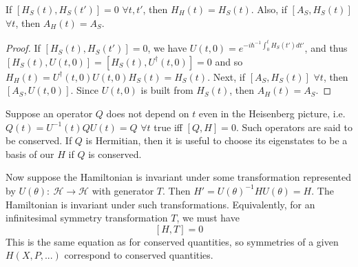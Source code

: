 \documentclass[a4paper]{article}
\begin{document}
\begin{thm}
If $[H_S(t),H_S(t')]=0$ $\forall t,t'$, then $H_H(t)=H_S(t)$. Also, if $[A_S,H_S(t)]$ $\forall t$, then $A_H(t)=A_S$.
\end{thm}
\begin{proof}
If $[H_S(t),H_S(t')]=0$, we have $U(t,0)=e^{-i\hbar^{-1}\int_0^tH_S(t')dt'}$, and thus $[H_S(t),U(t,0)]=[H_S(t),U^\dag(t,0)]=0$ and so $H_H(t)=U^\dag(t,0)U(t,0)H_S(t)=H_S(t)$. Next, if $[A_S,H_S(t)]$ $\forall t$, then $[A_S,U(t,0)]$. Since $U(t,0)$ is built from $H_S(t)$, then $A_H(t)=A_S$.
\end{proof}
\begin{defi}
Suppose an operator $Q$ does not depend on $t$ even in the Heisenberg picture, i.e. $Q(t)=U^{-1}(t)QU(t)=Q$ $\forall t$ true iff $[Q,H]=0$. Such operators are said to be conserved. If $Q$ is Hermitian, then it is useful to choose its eigenstates to be a basis of our $H$ if $Q$ is conserved.
\end{defi}
\begin{defi}
Now suppose the Hamiltonian is invariant under some transformation represented by $U(\theta):~\mathcal{H}\rightarrow\mathcal{H}$ with generator $T$. Then $H'=U(\theta)^{-1}HU(\theta)=H$. The Hamiltonian is invariant under such transformations. Equivalently, for an infinitesimal symmetry transformation $T$, we must have
$$[H,T]=0$$
This is the same equation as for conserved quantities, so symmetries of a given $H(X,P,...)$ correspond to conserved quantities.
\end{defi}
\newpage 
\end{document}
